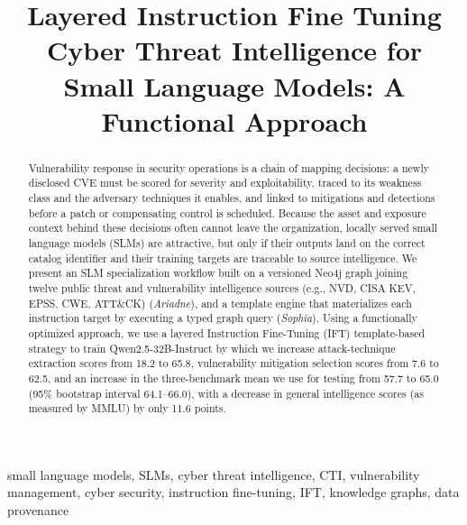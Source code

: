\documentclass[conference]{IEEEtran}
\begin{document}

\title{Layered Instruction Fine Tuning Cyber Threat Intelligence for Small Language Models: A Functional Approach}

\author{}

\maketitle
\pagestyle{plain}
\thispagestyle{plain}

\begin{abstract}
Vulnerability response in security operations is a chain of mapping decisions: a newly disclosed CVE must be scored for severity and exploitability, traced to its weakness class and the adversary techniques it enables, and linked to mitigations and detections before a patch or compensating control is scheduled. Because the asset and exposure context behind these decisions often cannot leave the organization, locally served small language models (SLMs) are attractive, but only if their outputs land on the correct catalog identifier and their training targets are traceable to source intelligence. We present an SLM specialization workflow built on a versioned Neo4j graph joining twelve public threat and vulnerability intelligence sources (e.g., NVD, CISA KEV, EPSS, CWE, ATT\&CK) (\emph{Ariadne}), and a template engine that materializes each instruction target by executing a typed graph query (\emph{Sophia}). Using a functionally optimized approach, we use a layered Instruction Fine-Tuning (IFT) template-based strategy to train Qwen2.5-32B-Instruct by which we increase attack-technique extraction scores from 18.2 to 65.8, vulnerability mitigation selection scores from 7.6 to 62.5, and an increase in the three-benchmark mean we use for testing from 57.7 to 65.0 (95\% bootstrap interval 64.1--66.0), with a decrease in general intelligence scores (as measured by MMLU) by only 11.6 points.
\end{abstract}

\begin{IEEEkeywords}
small language models, SLMs, cyber threat intelligence, CTI, vulnerability management, cyber security, instruction fine-tuning, IFT, knowledge graphs, data provenance
\end{IEEEkeywords}
\end{document}
